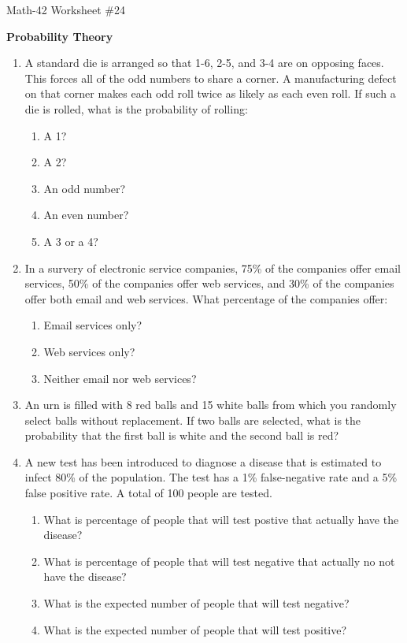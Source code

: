 \documentclass[letterpaper,12pt,fleqn]{article}
\begin{document}
\begin{center}
  \large Math-42 Worksheet \#24

  \textbf{Probability Theory}
\end{center}

\vspace{0.5in}

\begin{enumerate}[left=0in,itemsep=0.5in]
\item A standard die is arranged so that 1-6, 2-5, and 3-4 are on opposing faces.  This forces all of the odd numbers
  to share a corner.  A manufacturing defect on that corner makes each odd roll twice as likely as each even roll.
  If such a die is rolled, what is the probability of rolling:
  \begin{enumerate}
  \item A 1?
  \item A 2?
  \item An odd number?
  \item An even number?
  \item A 3 or a 4?
  \end{enumerate}

\item In a survery of electronic service companies, 75\% of the companies offer email services, 50\% of the
  companies offer web services, and 30\% of the companies offer both email and web services.  What percentage of
  the companies offer:
  \begin{enumerate}
  \item Email services only?
  \item Web services only?
  \item Neither email nor web services?
  \end{enumerate}

\item An urn is filled with 8 red balls and 15 white balls from which you randomly select balls without replacement.
  If two balls are selected, what is the probability that the first ball is white and the second ball is red?

\item A new test has been introduced to diagnose a disease that is estimated to infect 80\% of the population.
  The test has a 1\% false-negative rate and a 5\% false positive rate.  A total of 100 people are tested.
  \begin{enumerate}
  \item What is percentage of people that will test postive that actually have the disease?
  \item What is percentage of people that will test negative that actually no not have the disease?
  \item What is the expected number of people that will test negative?
  \item What is the expected number of people that will test positive?
  \end{enumerate}


\end{enumerate}
\end{document}
